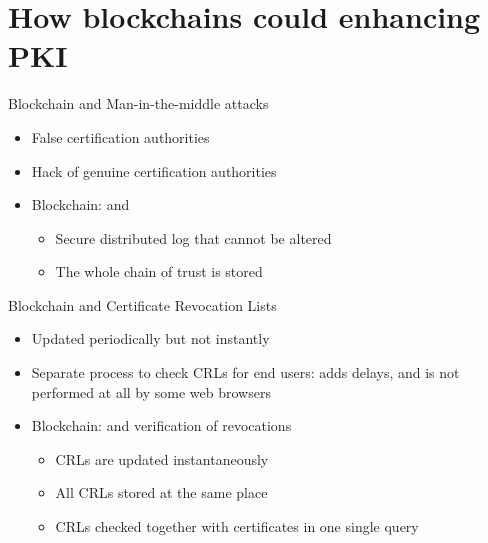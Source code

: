 \section[Blockchains for PKI]{How blockchains could enhancing PKI}


\begin{frame}{Blockchain and Man-in-the-middle attacks}
\begin{itemize}
\item False certification authorities
\item Hack of genuine certification authorities
\vspace{2mm}
\item Blockchain:  and 
\begin{itemize}
\item Secure distributed log that cannot be altered
\item The whole chain of trust is stored
\end{itemize}
\end{itemize}
\end{frame}

\begin{frame}{Blockchain and Certificate Revocation Lists}
\begin{itemize}
\item Updated periodically but not instantly
\item Separate process to check CRLs for end users: adds delays, and is not performed at all by some web browsers
\vspace{2mm}
\item Blockchain:  and  verification of revocations
\begin{itemize}
\item CRLs are updated instantaneously
\item All CRLs stored at the same place
\item CRLs checked together with certificates in one single query
\end{itemize}
\end{itemize}
\end{frame}




